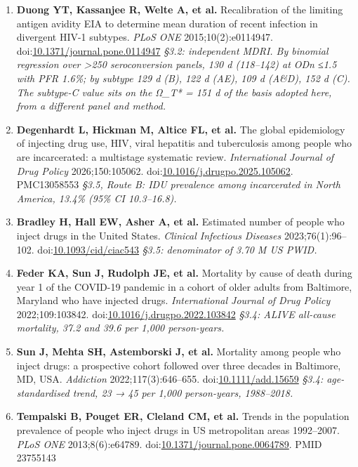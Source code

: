 \begin{enumerate}
\def\labelenumi{\arabic{enumi}.}
\setcounter{enumi}{8}
\item
  \textbf{Duong YT, Kassanjee R, Welte A, et al.} Recalibration of the limiting antigen avidity EIA to determine mean duration of recent infection in divergent HIV-1 subtypes. \emph{PLoS ONE} 2015;10(2):e0114947. doi:\href{https://doi.org/10.1371/journal.pone.0114947}{10.1371/journal.pone.0114947}
  \emph{§3.2: independent MDRI. By binomial regression over \textgreater250 seroconversion panels, 130 d (118--142) at ODn ≤1.5 with PFR 1.6\%; by subtype 129 d (B), 122 d (AE), 109 d (A\&D), 152 d (C). The subtype-C value sits on the Ω\_T* = 151 d of the basis adopted here, from a different panel and method.}
\item
  \textbf{Degenhardt L, Hickman M, Altice FL, et al.} The global epidemiology of injecting drug use, HIV, viral hepatitis and tuberculosis among people who are incarcerated: a multistage systematic review. \emph{International Journal of Drug Policy} 2026;150:105062. doi:\href{https://doi.org/10.1016/j.drugpo.2025.105062}{10.1016/j.drugpo.2025.105062}. PMC13058553
  \emph{§3.5, Route B: IDU prevalence among incarcerated in North America, 13.4\% (95\% CI 10.3--16.8).}
\item
  \textbf{Bradley H, Hall EW, Asher A, et al.} Estimated number of people who inject drugs in the United States. \emph{Clinical Infectious Diseases} 2023;76(1):96--102. doi:\href{https://doi.org/10.1093/cid/ciac543}{10.1093/cid/ciac543}
  \emph{§3.5: denominator of 3.70 M US PWID.}
\item
  \textbf{Feder KA, Sun J, Rudolph JE, et al.} Mortality by cause of death during year 1 of the COVID-19 pandemic in a cohort of older adults from Baltimore, Maryland who have injected drugs. \emph{International Journal of Drug Policy} 2022;109:103842. doi:\href{https://doi.org/10.1016/j.drugpo.2022.103842}{10.1016/j.drugpo.2022.103842}
  \emph{§3.4: ALIVE all-cause mortality, 37.2 and 39.6 per 1,000 person-years.}
\item
  \textbf{Sun J, Mehta SH, Astemborski J, et al.} Mortality among people who inject drugs: a prospective cohort followed over three decades in Baltimore, MD, USA. \emph{Addiction} 2022;117(3):646--655. doi:\href{https://doi.org/10.1111/add.15659}{10.1111/add.15659}
  \emph{§3.4: age-standardised trend, 23 → 45 per 1,000 person-years, 1988--2018.}
\item
  \textbf{Tempalski B, Pouget ER, Cleland CM, et al.} Trends in the population prevalence of people who inject drugs in US metropolitan areas 1992--2007. \emph{PLoS ONE} 2013;8(6):e64789. doi:\href{https://doi.org/10.1371/journal.pone.0064789}{10.1371/journal.pone.0064789}. PMID 23755143

\end{enumerate}
